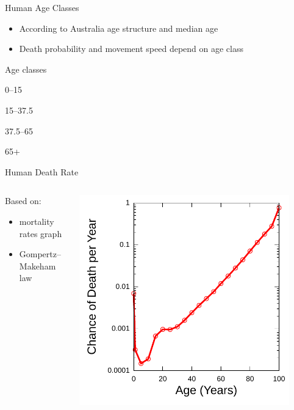 \documentclass{beamer}
\begin{document}
\begin{frame}{Human Age Classes}
    \begin{itemize}
        \item According to Australia age structure and median age
        \item Death probability and movement speed depend on age class
    \end{itemize}

    \begin{block}{Age classes}
        \begin{description}
            \item[Child] 0--15
            \item[Young] 15--37.5
            \item[Middle age] 37.5--65
            \item[Elderly] 65+
        \end{description}
    \end{block}
\end{frame}

\begin{frame}{Human Death Rate}
    \begin{columns}
        \begin{column}{0.5\textwidth}
            Based on:
            \begin{itemize}
                \item mortality rates graph
                \item Gompertz–Makeham law
            \end{itemize}
        \end{column}
        \begin{column}{0.5\textwidth}
            \includegraphics[width=0.9\textwidth]{USGompertzCurve}
        \end{column}
    \end{columns}
\end{frame}
\end{document}
